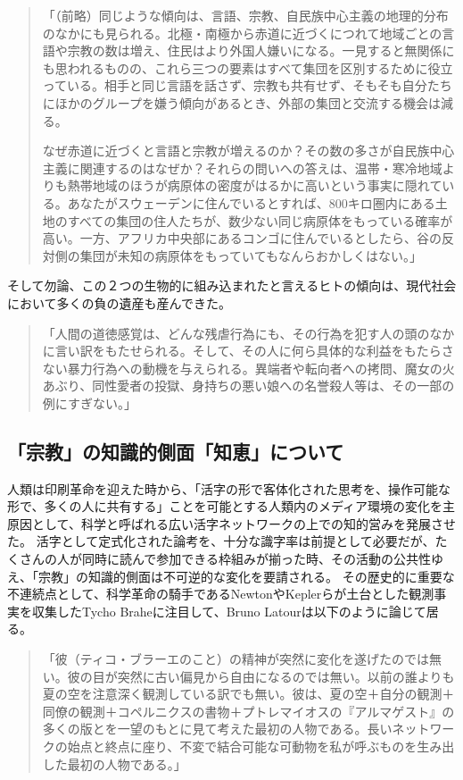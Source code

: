 \documentclass[uplatex, 10.5pt, dvipdfmx]{jsarticle}
\begin{document}
\begin{quotation}
    「（前略）同じような傾向は、言語、宗教、自民族中心主義の地理的分布のなかにも見られる。北極・南極から赤道に近づくにつれて地域ごとの言語や宗教の数は増え、住民はより外国人嫌いになる。一見すると無関係にも思われるものの、これら三つの要素はすべて集団を区別するために役立っている。相手と同じ言語を話さず、宗教も共有せず、そもそも自分たちにほかのグループを嫌う傾向があるとき、外部の集団と交流する機会は減る。
    
    なぜ赤道に近づくと言語と宗教が増えるのか？その数の多さが自民族中心主義に関連するのはなぜか？それらの問いへの答えは、温帯・寒冷地域よりも熱帯地域のほうが病原体の密度がはるかに高いという事実に隠れている。あなたがスウェーデンに住んでいるとすれば、800キロ圏内にある土地のすべての集団の住人たちが、数少ない同じ病原体をもっている確率が高い。一方、アフリカ中央部にあるコンゴに住んでいるとしたら、谷の反対側の集団が未知の病原体をもっていてもなんらおかしくはない。」\cite{異文化嫌い}
\end{quotation}

そして勿論、この２つの生物的に組み込まれたと言えるヒトの傾向は、現代社会において多くの負の遺産も産んできた。

\begin{quotation}
    「人間の道徳感覚は、どんな残虐行為にも、その行為を犯す人の頭のなかに言い訳をもたせられる。そして、その人に何ら具体的な利益をもたらさない暴力行為への動機を与えられる。異端者や転向者への拷問、魔女の火あぶり、同性愛者の投獄、身持ちの悪い娘への名誉殺人等は、その一部の例にすぎない。」\cite{暴力の人類学}
\end{quotation}

\subsection{「宗教」の知識的側面「知恵」について}

人類は印刷革命を迎えた時から、「活字の形で客体化された思考を、操作可能な形で、多くの人に共有する」ことを可能とする人類内のメディア環境の変化を主原因として、科学と呼ばれる広い活字ネットワークの上での知的営みを発展させた。
活字として定式化された論考を、十分な識字率は前提として必要だが、たくさんの人が同時に読んで参加できる枠組みが揃った時、その活動の公共性ゆえ、「宗教」の知識的側面は不可逆的な変化を要請される。
その歴史的に重要な不連続点として、科学革命の騎手であるNewtonやKeplerらが土台とした観測事実を収集したTycho Braheに注目して、Bruno Latourは以下のように論じて居る。

\begin{quotation}
    「彼（ティコ・ブラーエのこと）の精神が突然に変化を遂げたのでは無い。彼の目が突然に古い偏見から自由になるのでは無い。以前の誰よりも夏の空を注意深く観測している訳でも無い。彼は、夏の空＋自分の観測＋同僚の観測＋コペルニクスの書物＋プトレマイオスの『アルマゲスト』の多くの版とを一望のもとに見て考えた最初の人物である。長いネットワークの始点と終点に座り、不変で結合可能な可動物を私が呼ぶものを生み出した最初の人物である。」\cite{ラトゥール}
\end{quotation}
\end{document}
